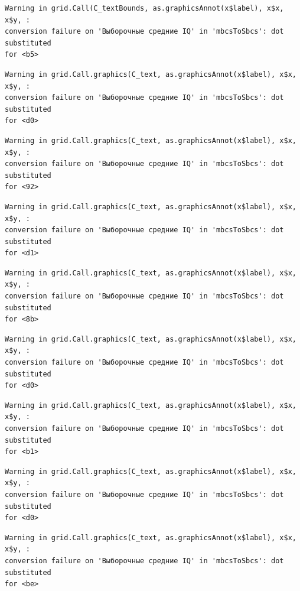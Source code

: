 \documentclass[
  letterpaper,
]{scrbook}
\theoremstyle{definition}
\theoremstyle{remark}
\begin{document}
\begin{verbatim}
Warning in grid.Call(C_textBounds, as.graphicsAnnot(x$label), x$x, x$y, :
conversion failure on 'Выборочные средние IQ' in 'mbcsToSbcs': dot substituted
for <b5>
\end{verbatim}

\begin{verbatim}
Warning in grid.Call.graphics(C_text, as.graphicsAnnot(x$label), x$x, x$y, :
conversion failure on 'Выборочные средние IQ' in 'mbcsToSbcs': dot substituted
for <d0>
\end{verbatim}

\begin{verbatim}
Warning in grid.Call.graphics(C_text, as.graphicsAnnot(x$label), x$x, x$y, :
conversion failure on 'Выборочные средние IQ' in 'mbcsToSbcs': dot substituted
for <92>
\end{verbatim}

\begin{verbatim}
Warning in grid.Call.graphics(C_text, as.graphicsAnnot(x$label), x$x, x$y, :
conversion failure on 'Выборочные средние IQ' in 'mbcsToSbcs': dot substituted
for <d1>
\end{verbatim}

\begin{verbatim}
Warning in grid.Call.graphics(C_text, as.graphicsAnnot(x$label), x$x, x$y, :
conversion failure on 'Выборочные средние IQ' in 'mbcsToSbcs': dot substituted
for <8b>
\end{verbatim}

\begin{verbatim}
Warning in grid.Call.graphics(C_text, as.graphicsAnnot(x$label), x$x, x$y, :
conversion failure on 'Выборочные средние IQ' in 'mbcsToSbcs': dot substituted
for <d0>
\end{verbatim}

\begin{verbatim}
Warning in grid.Call.graphics(C_text, as.graphicsAnnot(x$label), x$x, x$y, :
conversion failure on 'Выборочные средние IQ' in 'mbcsToSbcs': dot substituted
for <b1>
\end{verbatim}

\begin{verbatim}
Warning in grid.Call.graphics(C_text, as.graphicsAnnot(x$label), x$x, x$y, :
conversion failure on 'Выборочные средние IQ' in 'mbcsToSbcs': dot substituted
for <d0>
\end{verbatim}

\begin{verbatim}
Warning in grid.Call.graphics(C_text, as.graphicsAnnot(x$label), x$x, x$y, :
conversion failure on 'Выборочные средние IQ' in 'mbcsToSbcs': dot substituted
for <be>
\end{verbatim}
\end{document}
